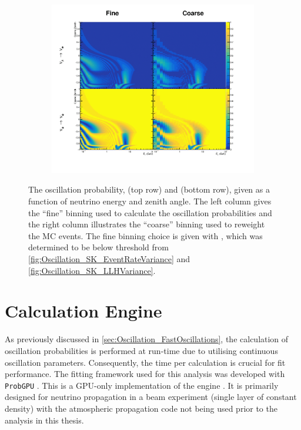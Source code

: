 \begin{figure}[h]
  \begin{subfigure}[t]{\textwidth}
    \includegraphics[width=\textwidth, trim={0mm 0mm 0mm 0mm}, clip,page=1]{Figures/Oscillation/SmearingImplementation.pdf}
  \end{subfigure}
  \caption{The oscillation probability,  (top row) and  (bottom row), given as a function of neutrino energy and zenith angle. The left column gives the ``fine'' binning used to calculate the oscillation probabilities and the right column illustrates the ``coarse'' binning used to reweight the MC events. The fine binning choice is given with , which was determined to be below threshold from \autoref{fig:Oscillation_SK_EventRateVariance} and \autoref{fig:Oscillation_SK_LLHVariance}.}
  \label{fig:Oscillation_SK_SmearingImplementation}
\end{figure}

\clearpage

\section{Calculation Engine}
\label{sec:Oscillation_CalculationEngine}

As previously discussed in \autoref{sec:Oscillation_FastOscillations}, the calculation of oscillation probabilities is performed at run-time due to utilising continuous oscillation parameters. Consequently, the time per calculation is crucial for fit performance. The fitting framework used for this analysis was developed with \texttt{ProbGPU} \cite{probgpu}. This is a GPU-only implementation of the  engine \cite{Prob3}. It is primarily designed for neutrino propagation in a beam experiment (single layer of constant density) with the atmospheric propagation code not being used prior to the analysis in this thesis.

